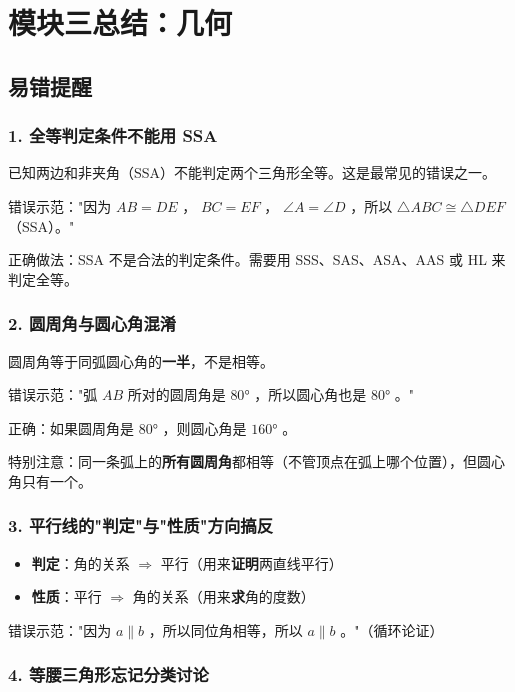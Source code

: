 \chapter*{模块三总结：几何}


\section*{易错提醒}


\subsection*{1. 全等判定条件不能用 SSA}


已知两边和非夹角（SSA）不能判定两个三角形全等。这是最常见的错误之一。

错误示范："因为 $AB = DE$ ， $BC = EF$ ， $\angle A = \angle D$ ，所以 $\triangle ABC \cong \triangle DEF$ （SSA）。"

正确做法：SSA 不是合法的判定条件。需要用 SSS、SAS、ASA、AAS 或 HL 来判定全等。

\subsection*{2. 圆周角与圆心角混淆}


圆周角等于同弧圆心角的\textbf{一半}，不是相等。

错误示范："弧 $AB$ 所对的圆周角是 $80°$ ，所以圆心角也是 $80°$ 。"

正确：如果圆周角是 $80°$ ，则圆心角是 $160°$ 。

特别注意：同一条弧上的\textbf{所有圆周角}都相等（不管顶点在弧上哪个位置），但圆心角只有一个。

\subsection*{3. 平行线的"判定"与"性质"方向搞反}


\begin{itemize}
  \item \textbf{判定}：角的关系 $\Rightarrow$ 平行（用来\textbf{证明}两直线平行）
  \item \textbf{性质}：平行 $\Rightarrow$ 角的关系（用来\textbf{求}角的度数）
\end{itemize}


错误示范："因为 $a \parallel b$ ，所以同位角相等，所以 $a \parallel b$ 。"（循环论证）

\subsection*{4. 等腰三角形忘记分类讨论}


